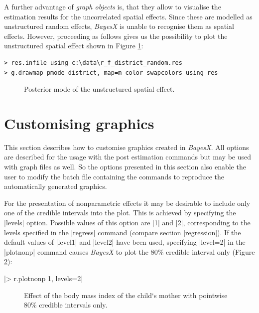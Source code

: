 \documentclass[a4paper]{article}
\begin{document}
A further advantage of {\it graph objects} is, that they allow to
visualise the estimation results for the uncorrelated spatial
effects. Since these are modelled as unstructured random effects,
{\it BayesX} is unable to recognise them as spatial effects.
However, proceeding as follows gives us the possibility to plot
the unstructured spatial effect shown in Figure \ref{random1}:

\begin{verbatim}
> res.infile using c:\data\r_f_district_random.res
> g.drawmap pmode district, map=m color swapcolors using res
\end{verbatim}

\begin{figure}[ht]
\begin{center}
{\it\caption{Posterior mode of the unstructured spatial
effect.\label{random1}}}
\end{center}
\end{figure}

\section{Customising graphics}\label{custom}

This section describes how to customise graphics created in {\em
BayesX}. All options are described for the usage with the post
estimation commands but may be used with graph files as well. So
the options presented in this section also enable the user to
modify the batch file containing the commands to reproduce the
automatically generated graphics.

For the presentation of nonparametric effects it may be desirable to
include only one of the credible intervals into the plot. This is
achieved by specifying the |levels| option. Possible values of this
option are |1| and |2|, corresponding to the levels specified in the
|regress| command (compare section \ref{regression}). If the default
values of |level1| and |level2| have been used, specifying |level=2|
in the |plotnonp| command causes {\it BayesX} to plot the 80\%
credible interval only (Figure \ref{bmi3}):

|> r.plotnonp 1, levels=2|

\begin{figure}[ht]
\begin{center}
 {\it\caption{Effect of
the body mass index of the child`s mother with pointwise 80\%
credible intervals only.\label{bmi3}}}
\end{center}
\end{figure}
\end{document}
